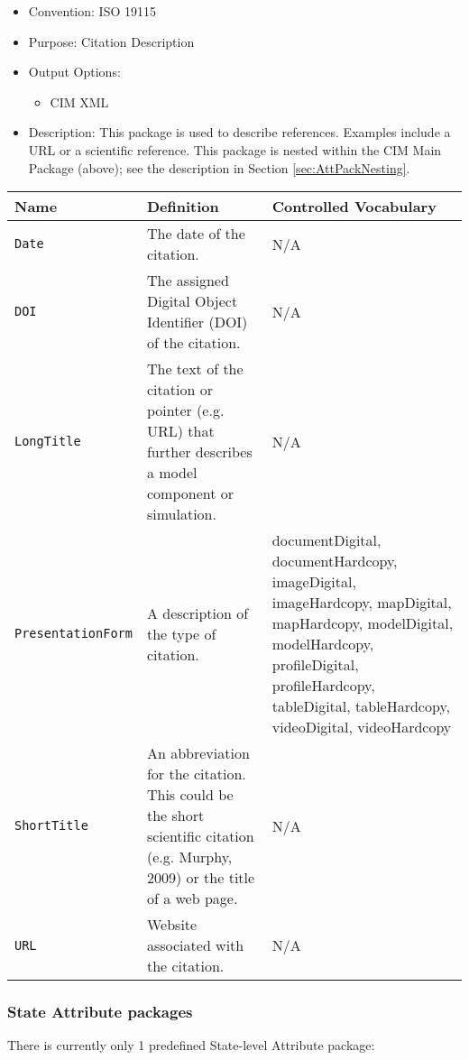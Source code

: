\begin{itemize}
    \item Convention: ISO 19115
    \item Purpose: Citation Description
    \item Output Options: 
    \begin{itemize}
        \item CIM XML 
    \end{itemize} 
    \item Description: This package is used to describe references. Examples include a URL or a scientific reference.  This package is nested within the CIM Main Package (above); see the description in Section \ref{sec:AttPackNesting}.
\end{itemize}


\begin{tabular}{|p{6cm}|p{10cm}|p{10cm}|}
     {\bf Name } & {\bf Definition} & {\bf Controlled Vocabulary} \\
     \hline\hline
     {\tt Date} & The date of the citation. & N/A\\
     {\tt DOI} & The assigned Digital Object Identifier (DOI) of the citation. & N/A\\
     {\tt LongTitle} & The text of the citation or pointer (e.g. URL) that further describes a model component or simulation. & N/A\\
     {\tt PresentationForm} & A description of the type of citation. & documentDigital, documentHardcopy, imageDigital, imageHardcopy, mapDigital, mapHardcopy, modelDigital, modelHardcopy, profileDigital, profileHardcopy, tableDigital, tableHardcopy, videoDigital, videoHardcopy\\
     {\tt ShortTitle} & An abbreviation for the citation.  This could be the short scientific citation (e.g. Murphy, 2009) or the title of a web page. & N/A \\     {\tt URL} & Website associated with the citation. & N/A\\
\end{tabular}



\vspace{.20in}
\subsubsection{State Attribute packages}
\label{StateAttributePackages}

There is currently only 1 predefined State-level Attribute package:

